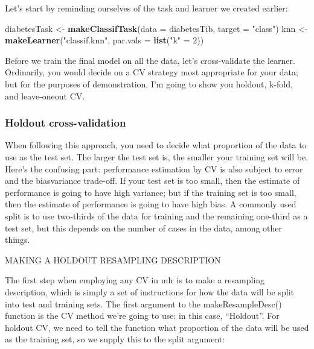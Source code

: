 \documentclass[
]{article}
\newenvironment{Shaded}{\begin{snugshade}}{\end{snugshade}}
\newcommand{\AttributeTok}[1]{\textcolor[rgb]{0.13,0.29,0.53}{#1}}
\newcommand{\DecValTok}[1]{\textcolor[rgb]{0.00,0.00,0.81}{#1}}
\newcommand{\FunctionTok}[1]{\textcolor[rgb]{0.13,0.29,0.53}{\textbf{#1}}}
\newcommand{\NormalTok}[1]{#1}
\newcommand{\OtherTok}[1]{\textcolor[rgb]{0.56,0.35,0.01}{#1}}
\newcommand{\StringTok}[1]{\textcolor[rgb]{0.31,0.60,0.02}{#1}}
\begin{document}
Let's start by reminding ourselves of the task and learner we created
earlier:

\begin{Shaded}
\begin{Highlighting}[]
\NormalTok{diabetesTask }\OtherTok{\textless{}{-}} \FunctionTok{makeClassifTask}\NormalTok{(}\AttributeTok{data =}\NormalTok{ diabetesTib, }\AttributeTok{target =} \StringTok{"class"}\NormalTok{)}
\NormalTok{knn }\OtherTok{\textless{}{-}} \FunctionTok{makeLearner}\NormalTok{(}\StringTok{"classif.knn"}\NormalTok{, }\AttributeTok{par.vals =} \FunctionTok{list}\NormalTok{(}\StringTok{"k"} \OtherTok{=} \DecValTok{2}\NormalTok{))}
\end{Highlighting}
\end{Shaded}

Before we train the final model on all the data, let's cross-validate
the learner. Ordinarily, you would decide on a CV strategy most
appropriate for your data; but for the purposes of demonstration, I'm
going to show you holdout, k-fold, and leave-oneout CV.

\subsubsection{Holdout cross-validation}\label{holdout-cross-validation}

When following this approach, you need to decide what proportion of the
data to use as the test set. The larger the test set is, the smaller
your training set will be. Here's the confusing part: performance
estimation by CV is also subject to error and the biasvariance
trade-off. If your test set is too small, then the estimate of
performance is going to have high variance; but if the training set is
too small, then the estimate of performance is going to have high bias.
A commonly used split is to use two-thirds of the data for training and
the remaining one-third as a test set, but this depends on the number of
cases in the data, among other things.

MAKING A HOLDOUT RESAMPLING DESCRIPTION

The first step when employing any CV in mlr is to make a resampling
description, which is simply a set of instructions for how the data will
be split into test and training sets. The first argument to the
makeResampleDesc() function is the CV method we're going to use: in this
case, ``Holdout''. For holdout CV, we need to tell the function what
proportion of the data will be used as the training set, so we supply
this to the split argument:
\end{document}
